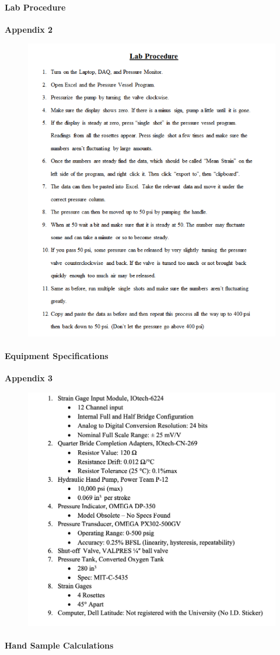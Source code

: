 \documentclass[12pt]{article}
\begin{document}
\paragraph{Lab Procedure}
\textbf{Appendix 2}
\begin{figure}[H]
	\centering
	\includegraphics [width=1.0\textwidth]{appendix_procedure}
\end{figure} 

\newpage
\paragraph{Equipment Specifications}
\textbf{Appendix 3}
\begin{figure}[H]
	\centering
	\includegraphics [width=1.0\textwidth]{appendix_equip}
\end{figure} 

\newpage
\paragraph{Hand Sample Calculations}
\end{document}
